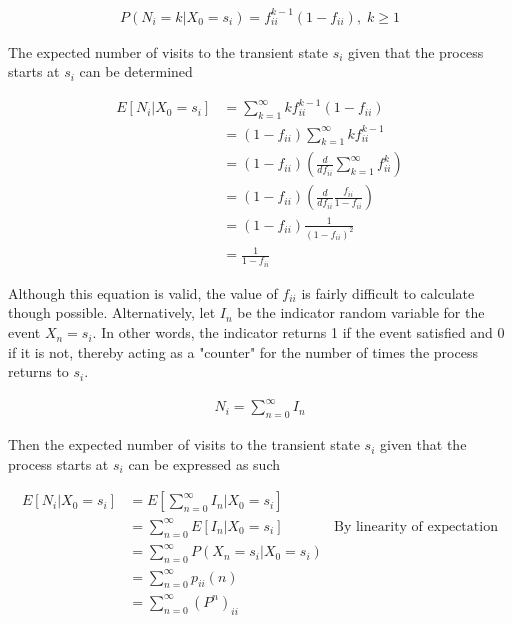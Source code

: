 \documentclass[a4paper,12pt]{article}
\theoremstyle{definition}
\begin{document}
	\begin{equation*}
	\begin{aligned}
		 P(N_i = k | X_0 = s_i) = f_{ii}^{k-1}(1-f_{ii}), \; k\geq1
	\end{aligned}
	\end{equation*}		
	
	The expected number of visits to the transient state $s_i$ given that the process starts at $s_i$ can be determined
	
	\begin{equation*}
		\begin{aligned}
			E[N_i|X_0 = s_i] &= \sum_{k=1}^\infty kf_{ii}^{k-1}(1-f_{ii}) \\
							&= (1-f_{ii})\sum_{k=1}^\infty kf_{ii}^{k-1} \\
							&= (1-f_{ii}) (\frac{d}{df_{ii}} \sum_{k=1}^\infty f_{ii}^{k}) \\
							&= (1-f_{ii}) (\frac{d}{df_{ii}} \frac{f_{ii}}{1-f_{ii}}) \\
							&= (1-f_{ii}) \frac{1}{(1-f_{ii})^2} \\
							&= \frac{1}{1-f_{ii}}\
		\end{aligned}
	\end{equation*}	
	
	Although this equation is valid, the value of $f_{ii}$ is fairly difficult to calculate though possible. Alternatively, let $I_n$ be the indicator random variable for the event $X_n=s_i$. In other words, the indicator returns 1 if the event satisfied and 0 if it is not, thereby acting as a "counter" for the number of times the process returns to $s_i$.
	
	\begin{equation*}
	\begin{aligned}
		 N_i = \sum_{n=0}^\infty I_n
	\end{aligned}
	\end{equation*}	
	
	 Then the expected number of visits to the transient state $s_i$ given that the process starts at $s_i$ can be expressed as such
	
	
	\begin{equation*}
	\begin{aligned}
		 E[N_i|X_0 = s_i] &= E\left[\sum_{n=0}^\infty I_n | X_0 = s_i\right] \\
		 				  &= \sum_{n=0}^\infty E\left[I_n | X_0 = s_i\right] &\text{By linearity of expectation}\\
		 				  &= \sum_{n=0}^\infty P(X_n = s_i | X_0 = s_i) \\
		 				  &= \sum_{n=0}^\infty p_{ii}(n) \\
		 				  &= \sum_{n=0}^\infty (P^n)_{ii}
	\end{aligned}
	\end{equation*}	
	
\end{document}
